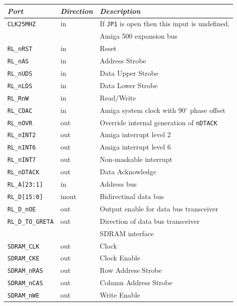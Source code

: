 \documentclass[a4paper]{report}
\begin{document}
\begin{table}
\begin{tabular}{*3l}    \toprule
\emph{Port}             & \emph{Direction}  & \emph{Description} \\ \midrule
\texttt{CLK25MHZ}       & in  & If \texttt{JP1} is open then this input is undefined. \\
\midrule
\midrule
                            &     & Amiga 500 expansion bus\\
\midrule
\texttt{RL\_nRST}           & in  & Reset\\
\texttt{RL\_nAS}            & in  & Address Strobe\\
\texttt{RL\_nUDS}           & in  & Data Upper Strobe\\
\texttt{RL\_nLDS}           & in  & Data Lower Strobe\\
\texttt{RL\_RnW}            & in  & Read/Write\\
\texttt{RL\_CDAC}           & in  & Amiga system clock with 90$^{\circ}$ phase offset\\
\texttt{RL\_nOVR}           & out & Override internal generation of \texttt{nDTACK}\\
\texttt{RL\_nINT2}          & out & Amiga interrupt level 2\\
\texttt{RL\_nINT6}          & out & Amiga interrupt level 6\\
\texttt{RL\_nINT7}          & out & Non-maskable interrupt\\
\texttt{RL\_nDTACK}         & out & Data Acknowledge\\
\texttt{RL\_A[23:1]}        & in  & Address bus \\
\texttt{RL\_D[15:0]}        & inout & Bidirectinal data bus \\
\texttt{RL\_D\_nOE}         & out & Output enable for data bus transceiver \\
\texttt{RL\_D\_TO\_GRETA}   & out & Direction of data bus transceiver\\
\midrule
\midrule
                            &       & SDRAM interface \\
\midrule
\texttt{SDRAM\_CLK}         & out   & Clock \\
\texttt{SDRAM\_CKE}         & out   & Clock Enable \\
\texttt{SDRAM\_nRAS}        & out   & Row Address Strobe \\
\texttt{SDRAM\_nCAS}        & out   & Column Address Strobe \\
\texttt{SDRAM\_nWE}         & out   & Write Enable \\

\end{tabular}
\end{table}
\end{document}

